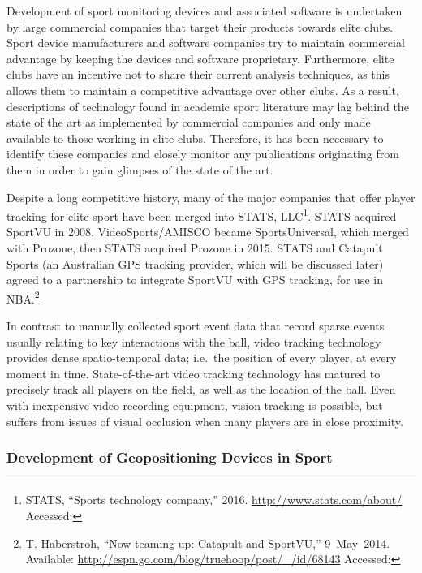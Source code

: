 Development of sport monitoring devices and associated software is undertaken by large commercial companies that target their products towards elite clubs. Sport device manufacturers and software companies try to maintain commercial advantage by keeping the devices and software proprietary. Furthermore, elite clubs have an incentive not to share their current analysis techniques, as this allows them to maintain a competitive advantage over other clubs. As a result, descriptions of technology found in academic sport literature may lag behind the state of the art as implemented by commercial companies and only made available to those working in elite clubs. Therefore, it has been necessary to identify these companies and closely monitor any publications originating from them in order to gain glimpses of the state of the art.

Despite a long competitive history, many of the major companies that
offer player tracking for elite sport have been merged into STATS, LLC\footnote{STATS, ``Sports technology company,''
  2016. \url{http://www.stats.com/about/} Accessed: }.
STATS acquired SportVU in 2008. VideoSports/AMISCO became SportsUniversal,
which merged with Prozone, then STATS acquired Prozone in 2015. STATS
and Catapult Sports (an Australian GPS tracking provider, which will be
discussed later) agreed to a partnership to integrate SportVU with GPS
tracking, for use in NBA.\footnote{T. Haberstroh, ``Now teaming up:
  Catapult and SportVU,'' 9~May~2014. Available:
  \url{http://espn.go.com/blog/truehoop/post/_/id/68143} Accessed: }

In contrast to manually collected sport event data that record sparse
events usually relating to key interactions with the ball, video
tracking technology provides dense spatio-temporal data; i.e.~the
position of every player, at every moment in time. State-of-the-art
video tracking technology has matured to precisely track all players on
the field, as well as the location of the ball. Even with inexpensive %
video recording equipment, vision tracking is possible, but suffers
from issues of visual occlusion when many players are in close
proximity.


\subsubsection{Development of Geopositioning Devices in
Sport}\label{development-of-geopositioning-devices-in-sport}

